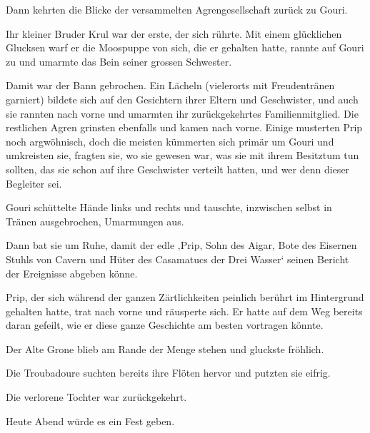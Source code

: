 Dann kehrten die Blicke der versammelten Agrengesellschaft zurück zu Gouri.

Ihr kleiner Bruder Krul war der erste, der sich rührte. Mit einem glücklichen Glucksen warf er die Moospuppe von sich, die er gehalten hatte, rannte auf Gouri zu und umarmte das Bein seiner grossen Schwester.

Damit war der Bann gebrochen. Ein Lächeln (vielerorts mit Freudentränen garniert) bildete sich auf den Gesichtern ihrer Eltern und Geschwister, und auch sie rannten nach vorne und umarmten ihr zurückgekehrtes Familienmitglied. Die restlichen Agren grinsten ebenfalls und kamen nach vorne. Einige musterten Prip noch argwöhnisch, doch die meisten kümmerten sich primär um Gouri und umkreisten sie, fragten sie, wo sie gewesen war, was sie mit ihrem Besitztum tun sollten, das sie schon auf ihre Geschwister verteilt hatten, und wer denn dieser Begleiter sei.

Gouri schüttelte Hände links und rechts und tauschte, inzwischen selbst in Tränen ausgebrochen, Umarmungen aus.

Dann bat sie um Ruhe, damit der edle ‚Prip, Sohn des Aigar, Bote des Eisernen Stuhls von Cavern und Hüter des Casamatucs der Drei Wasser‘ seinen Bericht der Ereignisse abgeben könne.

Prip, der sich während der ganzen Zärtlichkeiten peinlich berührt im Hintergrund gehalten hatte, trat nach vorne und räusperte sich. Er hatte auf dem Weg bereits daran gefeilt, wie er diese ganze Geschichte am besten vortragen könnte.

Der Alte Grone blieb am Rande der Menge stehen und gluckste fröhlich.

Die Troubadoure suchten bereits ihre Flöten hervor und putzten sie eifrig.

Die verlorene Tochter war zurückgekehrt.

Heute Abend würde es ein Fest geben.

